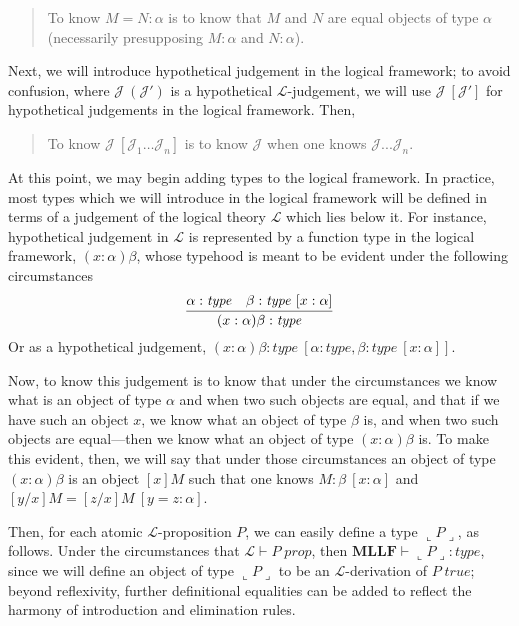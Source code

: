 \documentclass{amsart}
\theoremstyle{definition}
\theoremstyle{remark}
\numberwithin{equation}{section}
\newcommand\isprop[1]{\ensuremath{#1\;\mathit{prop}}}
\newcommand\istrue[1]{\ensuremath{#1\;\mathit{true}}}
\newcommand\hyp[2]{\ensuremath{#1\ (#2)}}
\newcommand\lfhyp[2]{\ensuremath{#1\ [#2]}}
\newcommand\MLLF{\textbf{MLLF}}
\newcommand\type[1]{\ensuremath{#1:\mathit{type}}}
\begin{document}
\begin{quote}
  To know $M=N:\alpha$ is to know that $M$ and $N$ are equal objects of type
  $\alpha$ (necessarily presupposing $M:\alpha$ and $N:\alpha$).
\end{quote}

Next, we will introduce hypothetical judgement in the logical framework; to
avoid confusion, where \hyp{\mathcal{J}}{\mathcal{J}'} is a hypothetical
$\mathcal{L}$-judgement, we will use \lfhyp{\mathcal{J}}{\mathcal{J}'} for
hypothetical judgements in the logical framework. Then,

\begin{quote}
  To know \lfhyp{\mathcal{J}}{\mathcal{J}_1\dots\mathcal{J}_n} is to know $\mathcal{J}$ when one knows $\mathcal{J}...\mathcal{J}_n$.
\end{quote}

At this point, we may begin adding types to the logical framework. In practice,
most types which we will introduce in the logical framework will be defined in
terms of a judgement of the logical theory $\mathcal{L}$ which lies below it.
For instance, hypothetical judgement in $\mathcal{L}$ is represented by a
function type in the logical framework, $(x:\alpha)\beta$, whose typehood is
meant to be evident under the following circumstances
\[
  \infer{
    \type{(x:\alpha)\beta}
  }{
    \type\alpha &
    \lfhyp{\type\beta}{x:\alpha}
  }
\]
Or as a hypothetical judgement,
\lfhyp{\type{(x:\alpha)\beta}}{\type\alpha,\lfhyp{\type\beta}{x:\alpha}}.

Now, to know this judgement is to know that under the circumstances we know
what is an object of type $\alpha$ and when two such objects are equal, and
that if we have such an object $x$, we know what an object of type $\beta$ is,
and when two such objects are equal---then we know what an object of type
$(x:\alpha)\beta$ is.  To make this evident, then, we will say that under those
circumstances an object of type $(x:\alpha)\beta$ is an object $[x]M$ such that
one knows \lfhyp{M:\beta}{x:\alpha} and \lfhyp{[y/x]M=[z/x]M}{y=z:\alpha}.

Then, for each atomic $\mathcal{L}$-proposition $P$, we can easily define a
type $\llcorner P\lrcorner$, as follows. Under the circumstances that
$\mathcal{L}\vdash\isprop{P}$, then $\MLLF\vdash\type{\llcorner P\lrcorner}$,
since we will define an object of type $\llcorner P\lrcorner$ to be an
$\mathcal{L}$-derivation of \istrue{P}; beyond reflexivity, further
definitional equalities can be added to reflect the harmony of introduction and
elimination rules.
\end{document}
